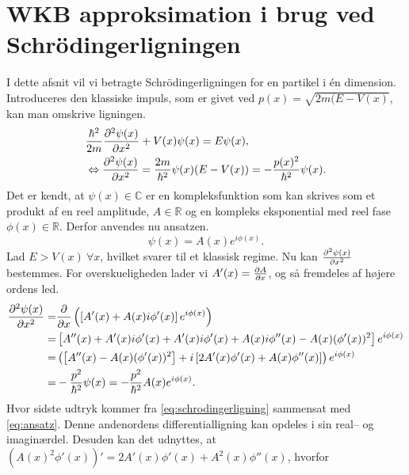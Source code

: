 
\section{WKB approksimation i brug ved Schrödingerligningen}
I dette afsnit vil vi betragte Schrödingerligningen for en partikel i én dimension. Introduceres den klassiske impuls, som er givet ved $p(x) = \sqrt{2m(E-V(x)}$, kan man omskrive ligningen.
%
\begin{align}
    & \frac{\hbar^2}{2m} \pdiff[2]{\psi(x)}{x} + V(x)\psi(x) = E\psi(x), \\
    & \Leftrightarrow \pdiff[2]{\psi(x)}{x} = \frac{2m}{\hbar^2}\psi(x)(E - V(x))  = - \frac{p(x)^2}{\hbar^2}\psi(x).
    \label{eq:schrodingerligning}
\end{align}
%
Det er kendt, at $\psi(x) \in \mathbb{C}$ er en kompleksfunktion som kan skrives som et produkt af en reel amplitude, $A \in \mathbb{R}$ og en kompleks eksponential med reel fase $\phi(x)\in \mathbb{R}$. Derfor anvendes nu ansatzen.
\begin{equation}
    \psi(x) = A(x) e^{i \phi(x)}.
    \label{eq:ansatz}
\end{equation}
Lad $E > V(x) \ \forall x$, hvilket svarer til et klassisk regime.
Nu kan $\pdiff[2]{\psi(x)}{x}$ bestemmes. For overskueligheden lader vi $A'(x) = \pdiff{A}{x}$, og så fremdeles af højere ordens led.
\begin{align}
    \pdiff[2]{\psi(x)}{x} = & \pdiff{}{x}\left( \left[ A'(x) + A(x)i\phi'(x) \right]e^{i\phi(x)} \right) \\
    = & \left[ A''(x) + A'(x)i\phi'(x) + A'(x)i\phi'(x) + A(x)i\phi''(x) - A(x)( \phi'(x))^2\right]e^{i\phi(x)} \\
    = & \left(\left[ A''(x) - A(x)(\phi'(x))^2\right] + i \left[2A'(x)\phi'(x) + A(x)\phi''(x) \right]\right)e^{i\phi(x)}\\
    = & -\frac{p^2}{\hbar^2}\psi(x) = -\frac{p^2}{\hbar^2} A(x)e^{i\phi(x)}.
    \label{eq:regime}
\end{align}
Hvor sidste udtryk kommer fra \cref{eq:schrodingerligning} sammensat med \cref{eq:ansatz}.
Denne andenordens differentialligning kan opdeles i sin real-- og imaginærdel. Desuden kan det udnyttes, at $\left( A(x)^2\phi'(x) \right)' = 2A'(x)\phi'(x) + A^2(x)\phi''(x)$, hvorfor

